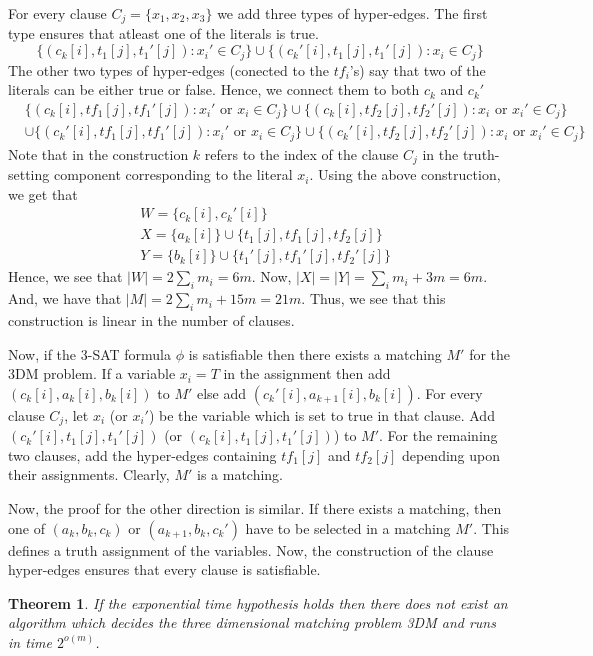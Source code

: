\documentclass[12pt]{article}
\newtheorem{theorem}{Theorem}
\begin{document}
For every clause $C_j = \{x_1, x_2, x_3\}$ we add three types of hyper-edges.  The first type ensures that atleast one of the literals is true. 
$$\{(c_k[i], t_1[j], t_1'[j]): x_i' \in C_j\} \cup \{(c_k'[i], t_1[j], t_1'[j]): x_i \in C_j\}$$ 
The other two types of hyper-edges (conected to the $tf_i$'s) say that two of the literals can be either true or false. Hence, we connect them to both $c_k$ and $c_k'$
\begin{align*}
  &\{(c_k[i], tf_1[j], tf_1'[j]): x_i' \text{ or }x_i\in C_j\} \cup \{(c_k[i], tf_2[j], tf_2'[j]): x_i \text{ or }x_i' \in C_j\}\\
  &\cup \{(c_k'[i], tf_1[j], tf_1'[j]): x_i' \text{ or }x_i\in C_j\} \cup \{(c_k'[i], tf_2[j], tf_2'[j]): x_i \text{ or }x_i' \in C_j\}
\end{align*}
Note that in the construction $k$ refers to the index of the clause $C_j$ in the truth-setting component corresponding to the literal $x_i$. Using the above construction, we get that
\begin{align*}
  & W = \{c_k[i], c_k'[i]\}\\
  & X = \{a_k[i]\} \cup \{t_1[j], tf_1[j], tf_2[j]\}\\
  & Y = \{b_k[i]\} \cup \{t_1'[j], tf_1'[j], tf_2'[j]\}
\end{align*} 
Hence, we see that $|W| = 2\sum_i m_i = 6m$. Now, $|X| = |Y| = \sum_i m_i + 3m = 6m$. And, we have that $|M| = 2\sum_i m_i + 15m = 21m$. Thus, we see that this construction is linear in the number of clauses. 

Now, if the 3-SAT formula $\phi$ is satisfiable then there exists a matching $M'$ for the 3DM problem. If a variable $x_i = T$ in the assignment then add $(c_k[i], a_k[i], b_k[i])$ to $M'$ else add $(c_k'[i], a_{k+1}[i], b_k[i])$. For every clause $C_j$, let $x_i$ (or $x_i'$) be the variable which is set to true in that clause. Add $(c_k'[i], t_1[j], t_1'[j])$  (or $(c_k[i], t_1[j], t_1'[j])$) to $M'$. For the remaining two clauses, add the hyper-edges containing $tf_1[j]$ and $tf_2[j]$ depending upon their assignments. Clearly, $M'$ is a matching. 

Now, the proof for the other direction is similar. If there exists a matching, then one of $(a_k, b_k, c_k)$ or $(a_{k+1}, b_k, c_k')$ have to be selected in a matching $M'$. This defines a truth assignment of the variables. Now, the construction of the clause hyper-edges ensures that every clause is satisfiable.

\begin{theorem}
If the exponential time hypothesis holds then there does not exist an algorithm which decides the three dimensional matching problem 3DM and runs in time $2^{o(m)}$.
\end{theorem}
\end{document}
